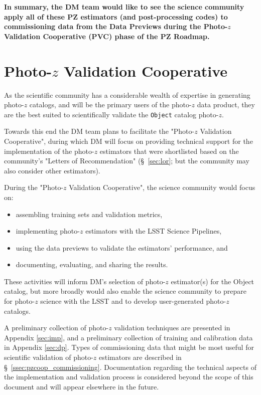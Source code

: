 \documentclass[DM,authoryear,toc]{lsstdoc}
\begin{document}
\textbf{In summary, the DM team would like to see the science community apply all of these PZ estimators (and post-processing codes) to commissioning data from the Data Previews during the Photo-$z$ Validation Cooperative (PVC) phase of the PZ Roadmap.}




\section{Photo-$z$ Validation Cooperative}\label{sec:pzcoop}

As the scientific community has a considerable wealth of expertise in generating photo-$z$ catalogs, and will be the primary users of the photo-$z$ data product, they are the best suited to scientifically validate the {\tt Object} catalog photo-$z$.

Towards this end the DM team plans to facilitate the "Photo-$z$ Validation Cooperative", during which DM will focus on providing technical support for the implementation of the photo-$z$ estimators that were shortlisted based on the community's "Letters of Recommendation" (\S~\ref{sec:lor}; but the community may also consider other estimators).

During the "Photo-$z$ Validation Cooperative", the science community would focus on:
\begin{itemize}
\item assembling training sets and validation metrics,
\item implementing photo-$z$ estimators with the LSST Science Pipelines,
\item using the data previews to validate the estimators' performance, and
\item documenting, evaluating, and sharing the results.
\end{itemize}

These activities will inform DM's selection of photo-$z$ estimator(s) for the Object catalog, but more broadly would also enable the science community to prepare for photo-$z$ science with the LSST and to develop user-generated photo-$z$ catalogs.

A preliminary collection of photo-$z$ validation techniques are presented in Appendix \ref{sec:imp}, and a preliminary collection of training and calibration data in Appendix \ref{sec:dp}.
Types of commissioning data that might be most useful for scientific validation of photo-$z$ estimators are described in \S~\ref{ssec:pzcoop_commissioning}.
Documentation regarding the technical aspects of the implementation and validation process is considered beyond the scope of this document and will appear elsewhere in the future.
\end{document}
